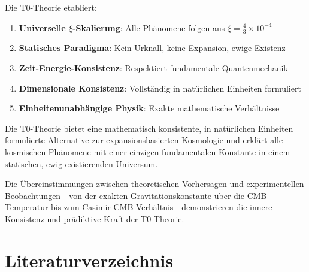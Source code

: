 \documentclass[12pt,a4paper]{article}
\begin{document}
	Die T0-Theorie etabliert:
	\begin{enumerate}
		\item \textbf{Universelle $\xi$-Skalierung}: Alle Phänomene folgen aus $\xi = \frac{4}{3} \times 10^{-4}$
		\item \textbf{Statisches Paradigma}: Kein Urknall, keine Expansion, ewige Existenz
		\item \textbf{Zeit-Energie-Konsistenz}: Respektiert fundamentale Quantenmechanik
		\item \textbf{Dimensionale Konsistenz}: Vollständig in natürlichen Einheiten formuliert
		\item \textbf{Einheitenunabhängige Physik}: Exakte mathematische Verhältnisse
	\end{enumerate}
	
	\begin{revolutionary}
		Die T0-Theorie bietet eine mathematisch konsistente, in natürlichen Einheiten formulierte Alternative zur expansionsbasierten Kosmologie und erklärt alle kosmischen Phänomene mit einer einzigen fundamentalen Konstante in einem statischen, ewig existierenden Universum.
	\end{revolutionary}
	
	Die Übereinstimmungen zwischen theoretischen Vorhersagen und experimentellen Beobachtungen - von der exakten Gravitationskonstante über die CMB-Temperatur bis zum Casimir-CMB-Verhältnis - demonstrieren die innere Konsistenz und prädiktive Kraft der T0-Theorie.
	
	\section{Literaturverzeichnis}
	
\end{document}
